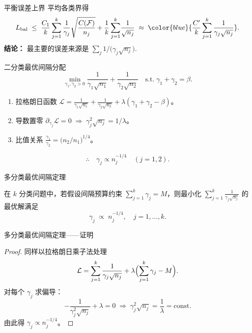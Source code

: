 \documentclass{beamer}
\begin{document}
\begin{frame}{平衡误差上界}
    平均各类界得
    \[
        L_{\text{bal}}
        \;\le\;
        \frac{C_1}{k}\sum_{j=1}^{k}
        \frac{1}{\gamma_j}\sqrt{\frac{C(\mathcal F)}{n_j}}
        +\frac{1}{k}\sum_{j=1}^{k}\!\frac{1}{\sqrt{n_j}}
        \;\approx\;
        \color{blue}{\frac{C'}{k}\sum_{j=1}^{k}\frac{1}{\gamma_j\sqrt{n_j}}}.
    \]
    \textbf{结论：} 最主要的误差来源是  
    \(
       \displaystyle\sum_{j} 1/\!\bigl(\gamma_j\sqrt{n_j}\bigr).
    \)
\end{frame}

\begin{frame}{二分类最优间隔分配}
    \[
        \min_{\gamma_1,\gamma_2>0}
        \frac{1}{\gamma_1\sqrt{n_1}}
        +\frac{1}{\gamma_2\sqrt{n_2}}
        \quad
        \text{s.t.}\;
        \gamma_1+\gamma_2=\beta.
    \]
    \begin{enumerate}
        \item 拉格朗日函数  
              $\displaystyle 
              \mathcal{L}=\frac{1}{\gamma_1\sqrt{n_1}}
              +\frac{1}{\gamma_2\sqrt{n_2}}
              +\lambda(\gamma_1+\gamma_2-\beta)$。
        \item 导数置零  
              $\partial_{\gamma_j}\mathcal L=0
              \;\Rightarrow\;
              \gamma_j^2\sqrt{n_j}=1/\lambda$。
        \item 比值关系  
              $\displaystyle
              \frac{\gamma_1}{\gamma_2}=\bigl(n_2/n_1\bigr)^{1/4}$。
    \end{enumerate}
    \[
        \therefore\quad
        \boxed{\gamma_j\propto n_j^{-1/4}}\quad(j=1,2).
    \]
\end{frame}

\begin{frame}[fragile]{多分类最优间隔定理}
\begin{theorem}[多分类最优间隔]
在 $k$ 分类问题中，若假设间隔预算约束
\(\sum_{j=1}^k \gamma_j = M\)，则最小化
\(\sum_{j=1}^k \frac{1}{\gamma_j\sqrt{n_j}}\)
的最优解满足
\[
\gamma_j \;\propto\; n_j^{-1/4},
\quad j=1,\dots,k.
\]
\end{theorem}
\end{frame}

\begin{frame}[fragile]{多分类最优间隔定理——证明}
\begin{proof}
同样以拉格朗日乘子法处理
\[
\mathcal{L}
= \sum_{j=1}^k \frac{1}{\gamma_j\sqrt{n_j}}
+ \lambda\Bigl(\sum_{j=1}^k\gamma_j - M\Bigr).
\]
对每个 $\gamma_j$ 求偏导：
\[
-\frac{1}{\gamma_j^{2}\sqrt{n_j}} + \lambda = 0
\;\Longrightarrow\;
\gamma_j^2\sqrt{n_j} = \frac{1}{\lambda} = \text{const}.
\]
由此得 $\gamma_j\propto n_j^{-1/4}$。
\end{proof}
\end{frame}
\end{document}
